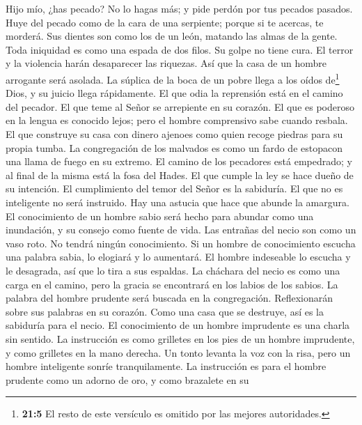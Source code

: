  Hijo mío, ¿has pecado? No lo hagas más; y pide perdón por
tus pecados pasados.  Huye del pecado como de la cara de
una serpiente; porque si te acercas, te morderá. Sus dientes son como
los de un león, matando las almas de la gente.  Toda
iniquidad es como una espada de dos filos. Su golpe no tiene cura.
 El terror y la violencia harán desaparecer las riquezas.
Así que la casa de un hombre arrogante será asolada.  La
súplica de la boca de un pobre llega a los oídos de\footnote{\textbf{21:5}
  El resto de este versículo es omitido por las mejores autoridades.}
Dios, y su juicio llega rápidamente.  El que odia la
reprensión está en el camino del pecador. El que teme al Señor se
arrepiente en su corazón.  El que es poderoso en la lengua
es conocido lejos; pero el hombre comprensivo sabe cuando resbala.
 El que construye su casa con dinero ajenoes como quien
recoge piedras para su propia tumba.  La congregación de
los malvados es como un fardo de estopacon una llama de fuego en su
extremo.  El camino de los pecadores está empedrado; y al
final de la misma está la fosa del Hades.  El que cumple
la ley se hace dueño de su intención. El cumplimiento del temor del
Señor es la sabiduría.  El que no es inteligente no será
instruido. Hay una astucia que hace que abunde la amargura.
 El conocimiento de un hombre sabio será hecho para
abundar como una inundación, y su consejo como fuente de vida.
 Las entrañas del necio son como un vaso roto. No tendrá
ningún conocimiento.  Si un hombre de conocimiento
escucha una palabra sabia, lo elogiará y lo aumentará. El hombre
indeseable lo escucha y le desagrada, así que lo tira a sus espaldas.
 La cháchara del necio es como una carga en el camino,
pero la gracia se encontrará en los labios de los sabios.
 La palabra del hombre prudente será buscada en la
congregación. Reflexionarán sobre sus palabras en su corazón.
 Como una casa que se destruye, así es la sabiduría para
el necio. El conocimiento de un hombre imprudente es una charla sin
sentido.  La instrucción es como grilletes en los pies de
un hombre imprudente, y como grilletes en la mano derecha.
 Un tonto levanta la voz con la risa, pero un hombre
inteligente sonríe tranquilamente.  La instrucción es
para el hombre prudente como un adorno de oro, y como brazalete en su
